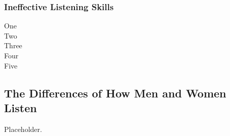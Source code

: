 \documentclass[stu,12pt]{apa7}
\begin{document}
      \subsubsection{Ineffective Listening Skills}
          \begin{description}
            \item[One]
            \item[Two]
            \item[Three]
            \item[Four]
            \item[Five]
          \end{description}


    \subsection{The Differences of How Men and Women Listen}
      Placeholder.




  \newpage
  \printbibliography[%
    title={References},%
    heading={bibintoc},%
    notcategory={consulted}%
  ]

  \newpage
  \nocite{*}
  \printbibliography[%
    title={Additional References},%
    heading={bibintoc},%
    category={consulted}%
  ]
\end{document}
